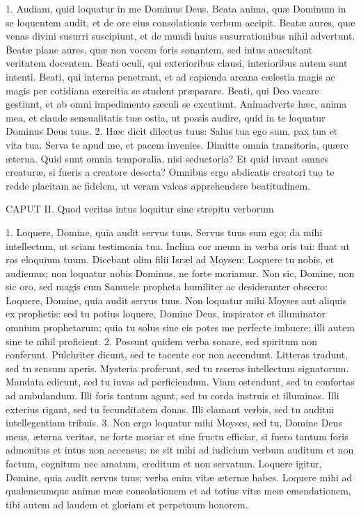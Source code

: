 \documentclass[twoside]{article}
\begin{document}
1. Audiam, quid loquatur in me Dominus Deus. Beata anima, quæ Dominum in se loquentem audit, et de ore eius consolationis verbum accipit. Beatæ aures, quæ venas divini susurri suscipiunt, et de mundi huius susurrationibus nihil advertunt. Beatæ plane aures, quæ non vocem foris sonantem, sed intus auscultant veritatem docentem. Beati oculi, qui exterioribus clausi, interioribus autem sunt intenti. Beati, qui interna penetrant, et ad capienda arcana cælestia magis ac magis per cotidiana exercitia se student præparare. Beati, qui Deo vacare gestiunt, et ab omni impedimento sæculi se excutiunt. Animadverte hæc, anima mea, et claude sensualitatis tuæ ostia, ut possis audire, quid in te loquatur Dominus Deus tuus.
2. Hæc dicit dilectus tuus: Salus tua ego sum, pax tua et vita tua. Serva te apud me, et pacem invenies. Dimitte omnia transitoria, quære æterna. Quid sunt omnia temporalia, nisi seductoria? Et quid iuvant omnes creaturæ, si fueris a creatore deserta? Omnibus ergo abdicatis creatori tuo te redde placitam ac fidelem, ut veram valeas apprehendere beatitudinem.


CAPUT II.
Quod veritas intus loquitur sine strepitu verborum

1. Loquere, Domine, quia audit servus tuus. Servus tuus sum ego; da mihi intellectum, ut sciam testimonia tua. Inclina cor meum in verba oris tui: fluat ut ros eloquium tuum. Dicebant olim filii Isræl ad Moysen: Loquere tu nobis, et audiemus; non loquatur nobis Dominus, ne forte moriamur. Non sic, Domine, non sic oro, sed magis cum Samuele propheta humiliter ac desideranter obsecro: Loquere, Domine, quia audit servus tuus. Non loquatur mihi Moyses aut aliquis ex prophetis: sed tu potius loquere, Domine Deus, inspirator et illuminator omnium prophetarum; quia tu solus sine eis potes me perfecte imbuere; illi autem sine te nihil proficient.
2. Possunt quidem verba sonare, sed spiritum non conferunt. Pulchriter dicunt, sed te tacente cor non accendunt. Litteras tradunt, sed tu sensum aperis. Mysteria proferunt, sed tu reseras intellectum signatorum. Mandata edicunt, sed tu iuvas ad perficiendum. Viam ostendunt, sed tu confortas ad ambulandum. Illi foris tantum agunt, sed tu corda instruis et illuminas. Illi exterius rigant, sed tu fecunditatem donas. Illi clamant verbis, sed tu auditui intellegentiam tribuis.
3. Non ergo loquatur mihi Moyses, sed tu, Domine Deus meus, æterna veritas, ne forte moriar et sine fructu efficiar, si fuero tantum foris admonitus et intus non accensus; ne sit mihi ad iudicium verbum auditum et non factum, cognitum nec amatum, creditum et non servatum. Loquere igitur, Domine, quia audit servus tuus; verba enim vitæ æternæ habes. Loquere mihi ad qualemcumque animæ meæ consolationem et ad totius vitæ meæ emendationem, tibi autem ad laudem et gloriam et perpetuum honorem.
\end{document}
